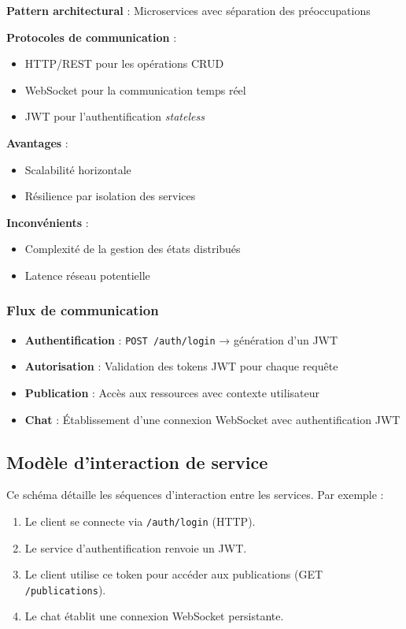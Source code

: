\documentclass[12pt]{rapportPfe}
\begin{document}
\textbf{Pattern architectural} : Microservices avec séparation des préoccupations

\textbf{Protocoles de communication} :
\begin{itemize}[label=--]
    \item HTTP/REST pour les opérations CRUD
    \item WebSocket pour la communication temps réel
    \item JWT pour l'authentification \textit{stateless}
\end{itemize}

\textbf{Avantages} :
\begin{itemize}[label=+]
    \item Scalabilité horizontale
    \item Résilience par isolation des services
\end{itemize}

\textbf{Inconvénients} :
\begin{itemize}[label=-]
    \item Complexité de la gestion des états distribués
    \item Latence réseau potentielle
\end{itemize}

\subsubsection*{Flux de communication}

\begin{itemize}
    \item \textbf{Authentification} : \texttt{POST /auth/login} → génération d'un JWT
    \item \textbf{Autorisation} : Validation des tokens JWT pour chaque requête
    \item \textbf{Publication} : Accès aux ressources avec contexte utilisateur
    \item \textbf{Chat} : Établissement d’une connexion WebSocket avec authentification JWT
\end{itemize}


\FloatBarrier
\subsection{Modèle d'interaction de service}

Ce schéma détaille les séquences d’interaction entre les services. Par exemple :

\begin{enumerate}
    \item Le client se connecte via \texttt{/auth/login} (HTTP).
    \item Le service d’authentification renvoie un JWT.
    \item Le client utilise ce token pour accéder aux publications (GET \texttt{/publications}).
    \item Le chat établit une connexion WebSocket persistante.
\end{enumerate}
\end{document}
